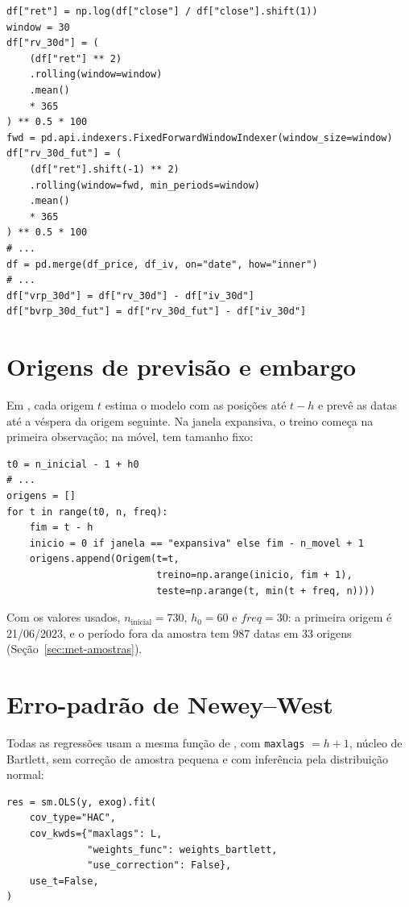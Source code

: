 \begin{verbatim}
df["ret"] = np.log(df["close"] / df["close"].shift(1))
window = 30
df["rv_30d"] = (
    (df["ret"] ** 2)
    .rolling(window=window)
    .mean()
    * 365
) ** 0.5 * 100
fwd = pd.api.indexers.FixedForwardWindowIndexer(window_size=window)
df["rv_30d_fut"] = (
    (df["ret"].shift(-1) ** 2)
    .rolling(window=fwd, min_periods=window)
    .mean()
    * 365
) ** 0.5 * 100
# ...
df = pd.merge(df_price, df_iv, on="date", how="inner")
# ...
df["vrp_30d"] = df["rv_30d"] - df["iv_30d"]
df["bvrp_30d_fut"] = df["rv_30d_fut"] - df["iv_30d"]
\end{verbatim}

\section{Origens de previsão e embargo}

Em , cada origem $t$ estima o modelo com as
posições até $t - h$ e prevê as datas até a véspera da origem seguinte. Na
janela expansiva, o treino começa na primeira observação; na móvel, tem
tamanho fixo:

\begin{verbatim}
t0 = n_inicial - 1 + h0
# ...
origens = []
for t in range(t0, n, freq):
    fim = t - h
    inicio = 0 if janela == "expansiva" else fim - n_movel + 1
    origens.append(Origem(t=t,
                          treino=np.arange(inicio, fim + 1),
                          teste=np.arange(t, min(t + freq, n))))
\end{verbatim}

Com os valores usados, $n_{\text{inicial}} = 730$, $h_0 = 60$ e
$\textit{freq} = 30$: a primeira origem é 21/06/2023, e o período fora da
amostra tem 987 datas em 33 origens (Seção~\ref{sec:met-amostras}).

\section{Erro-padrão de Newey--West}

Todas as regressões usam a mesma função de , com
\texttt{maxlags} $= h + 1$, núcleo de Bartlett, sem correção de amostra
pequena e com inferência pela distribuição normal:

\begin{verbatim}
res = sm.OLS(y, exog).fit(
    cov_type="HAC",
    cov_kwds={"maxlags": L,
              "weights_func": weights_bartlett,
              "use_correction": False},
    use_t=False,
)
\end{verbatim}


